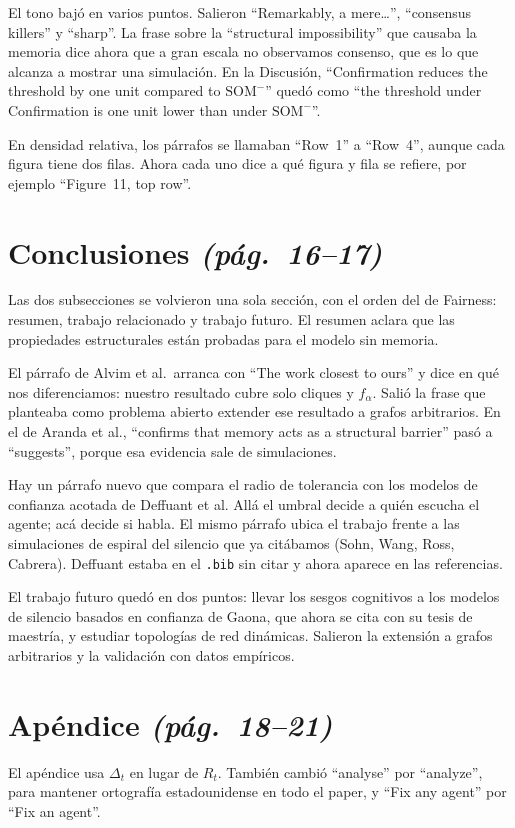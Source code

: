 \documentclass[11pt,a4paper]{article}
\newcommand{\SOMm}{$\mathrm{SOM}^{-}$}
\newcommand{\pag}[1]{\textit{(pág.~#1)}}
\begin{document}
El tono bajó en varios puntos. Salieron ``Remarkably, a mere\ldots'',
``consensus killers'' y ``sharp''. La frase sobre la ``structural
impossibility'' que causaba la memoria dice ahora que a gran escala no
observamos consenso, que es lo que alcanza a mostrar una simulación. En la
Discusión, ``Confirmation reduces the threshold by one unit compared to
\SOMm'' quedó como ``the threshold under Confirmation is one unit lower than
under \SOMm''.

En densidad relativa, los párrafos se llamaban ``Row~1'' a ``Row~4'', aunque
cada figura tiene dos filas. Ahora cada uno dice a qué figura y fila se
refiere, por ejemplo ``Figure~11, top row''.

\section*{Conclusiones \pag{16--17}}

Las dos subsecciones se volvieron una sola sección, con el orden del de
Fairness: resumen, trabajo relacionado y trabajo futuro. El resumen aclara que
las propiedades estructurales están probadas para el modelo sin memoria.

El párrafo de Alvim et al.\ arranca con ``The work closest to ours'' y dice en
qué nos diferenciamos: nuestro resultado cubre solo cliques y $f_\alpha$. Salió la frase que
planteaba como problema abierto extender ese resultado a grafos arbitrarios. En el
de Aranda et al., ``confirms that memory acts as a structural barrier'' pasó a
``suggests'', porque esa evidencia sale de simulaciones.

Hay un párrafo nuevo que compara el radio de tolerancia con los modelos de
confianza acotada de Deffuant et al. Allá el umbral decide a quién escucha el
agente; acá decide si habla. El mismo párrafo ubica el trabajo frente a las
simulaciones de espiral del silencio que ya citábamos (Sohn, Wang, Ross,
Cabrera). Deffuant estaba en el \texttt{.bib} sin citar y ahora aparece en las
referencias.

El trabajo futuro quedó en dos puntos: llevar los sesgos cognitivos a los
modelos de silencio basados en confianza de Gaona, que ahora se cita con su
tesis de maestría, y estudiar topologías de red dinámicas. Salieron la
extensión a grafos arbitrarios y la validación con datos empíricos.

\section*{Apéndice \pag{18--21}}

El apéndice usa $\Delta_t$ en lugar de $R_t$. También cambió ``analyse'' por
``analyze'', para mantener ortografía estadounidense en todo el paper, y ``Fix
any agent'' por ``Fix an agent''.
\end{document}
